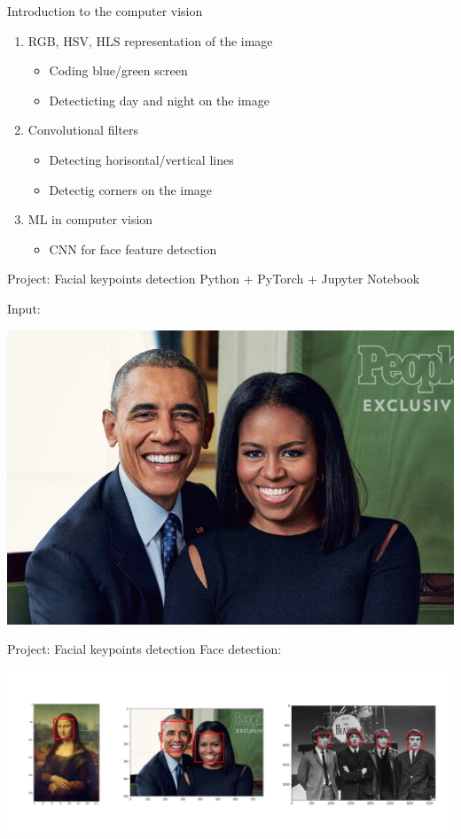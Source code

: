 \documentclass{beamer}
\begin{document}
\begin{frame}{Introduction to the computer vision}
\begin{enumerate}
\item RGB, HSV, HLS representation of the image
\begin{itemize}
\item Coding blue/green screen
\item Detecticting day and night on the image
\end{itemize}
\item Convolutional filters
\begin{itemize}
\item Detecting horisontal/vertical lines
\item Detectig corners on the image
\end{itemize}
\item ML in computer vision
\begin{itemize}
\item CNN for face feature detection
\end{itemize}
\end{enumerate}
\end{frame}

\begin{frame}{Project: Facial keypoints detection}
Python + PyTorch + Jupyter Notebook

Input:
\begin{center}
\includegraphics[scale=0.35]{images/obamas.jpg}
\end{center}
\end{frame}

\begin{frame}{Project: Facial keypoints detection}
Face detection:
\begin{center}
\includegraphics[scale=0.4]{images/haar_cascade_ex.png}
\end{center}
\end{frame}
\end{document}
